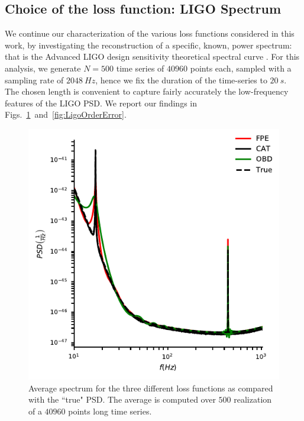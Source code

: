 \documentclass{aa}
\begin{document}
\subsection{Choice of the loss function: LIGO Spectrum} \label{sec:LIGO_validation}
We continue our characterization of the various loss functions considered in this work, by investigating the 
reconstruction of a specific, known, power spectrum: that is the Advanced LIGO \citep{LIGO_2015, Virgo_2014, KAGRA_2012, KAGRA_2013} design sensitivity theoretical spectral curve \citep{LVK_future_2013, LIGO_PSDs}.
For this analysis, we generate $N = 500$ time series of $40960$ points each, sampled with a sampling rate of $\SI{2048}{Hz}$, hence we fix the duration
of the time-series to $\SI{20}{s}$. The chosen length is convenient to capture fairly accurately the low-frequency features of the LIGO PSD.
We report our findings in Figs.~\ref{fig:ligospectrum}~and~\ref{fig:LigoOrderError}.

\begin{figure}
    \centering
     \includegraphics[width = \linewidth]{Images/optimisers_comparison/ligo/compare_estimates.pdf}
      \caption{Average spectrum for the three different loss functions as compared with the ``true" PSD. The average is computed over $500$ realization of a $40960$ points long time series.}
       \label{fig:ligospectrum}
\end{figure}
\end{document}
